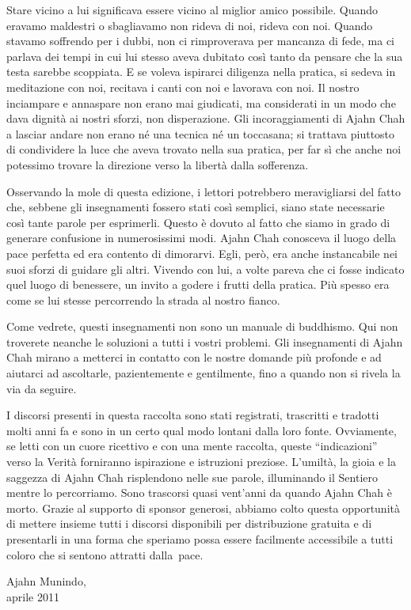 Stare vicino a lui significava essere vicino al miglior amico possibile.
Quando eravamo maldestri o sbagliavamo non rideva di noi, rideva con
noi. Quando stavamo soffrendo per i dubbi, non ci rimproverava per
mancanza di fede, ma ci parlava dei tempi in cui lui stesso aveva
dubitato così tanto da pensare che la sua testa sarebbe scoppiata. E se
voleva ispirarci diligenza nella pratica, si sedeva in meditazione con
noi, recitava i canti con noi e lavorava con noi. Il nostro inciampare e
annaspare non erano mai giudicati, ma considerati in un modo che dava
dignità ai nostri sforzi, non disperazione. Gli incoraggiamenti di Ajahn
Chah a lasciar andare non erano né una tecnica né un toccasana; si
trattava piuttosto di condividere la luce che aveva trovato nella sua
pratica, per far sì che anche noi potessimo trovare la direzione verso
la libertà dalla sofferenza.

Osservando la mole di questa edizione, i lettori potrebbero
meravigliarsi del fatto che, sebbene gli insegnamenti fossero stati così
semplici, siano state necessarie così tante parole per esprimerli.
Questo è dovuto al fatto che siamo in grado di generare confusione in
numerosissimi modi. Ajahn Chah conosceva il luogo della pace perfetta ed
era contento di dimorarvi. Egli, però, era anche instancabile nei suoi
sforzi di guidare gli altri. Vivendo con lui, a volte pareva che ci
fosse indicato quel luogo di benessere, un invito a godere i frutti
della pratica. Più spesso era come se lui stesse percorrendo la strada
al nostro fianco.

Come vedrete, questi insegnamenti non sono un manuale di buddhismo. Qui
non troverete neanche le soluzioni a tutti i vostri problemi. Gli
insegnamenti di Ajahn Chah mirano a metterci in contatto con le nostre
domande più profonde e ad aiutarci ad ascoltarle, pazientemente e
gentilmente, fino a quando non si rivela la via da seguire.

\enlargethispage{-\baselineskip}

I discorsi presenti in questa raccolta sono stati registrati, trascritti
e tradotti molti anni fa e sono in un certo qual modo lontani dalla loro
fonte. Ovviamente, se letti con un cuore ricettivo e con una mente
raccolta, queste ``\mbox{indicazioni}'' verso la Verità forniranno ispirazione
e istruzioni preziose. L'umiltà, la gioia e la saggezza di Ajahn Chah
risplendono nelle sue parole, illuminando il Sentiero mentre lo
percorriamo. Sono trascorsi quasi vent'anni da quando Ajahn Chah è
morto. Grazie al supporto di sponsor generosi, abbiamo colto questa
opportunità di mettere insieme tutti i discorsi disponibili per
distribuzione gratuita e di presentarli in una forma che speriamo possa
essere facilmente accessibile a tutti coloro che si sentono attratti
dalla~pace.

\bigskip

{\raggedleft
  Ajahn Munindo,\\
  aprile 2011
\par}
